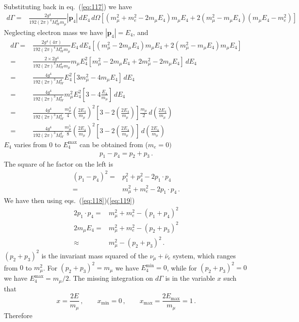 Substituting back in eq.~(\ref{eq:117}) we have 
\begin{align}
  d\Gamma=&\frac{2g^4}{192 (2\pi)^4 M_W^4 m_\mu }|\mathbf{p}_4|\,d E_4\,d\Omega[(m_\mu^2+m_e^2-2m_\mu E_4)m_\mu E_4 
  +2(m_\mu^2-m_\mu E_4)(m_\mu E_4-m_e^2)]
\end{align}
Neglecting electron mass we have $|\mathbf{p}_4| = E_4$, and
\begin{align}
  \label{eq:159}
   d\Gamma=&\frac{2g^4(4\pi)}{192 (2\pi)^4 M_W^4 m_\mu }E_4\,d E_4[(m_\mu^2-2m_\mu E_4)m_\mu E_4 
  +2(m_\mu^2-m_\mu E_4)m_\mu E_4]\nonumber\\
  =&\frac{2\times2g^4}{192 (2\pi)^3 M_W^4 m_\mu }m_\mu E_4^2[m_\mu^2-2m_\mu E_4
  +2m_\mu^2-2m_\mu E_4]\,d E_4\nonumber\\
  =&\frac{4g^4}{192 (2\pi)^3 M_W^4 }E_4^2\left[3m_\mu^2-4m_\mu E_4\right]\,d E_4\nonumber\\
  =&\frac{4g^4}{192 (2\pi)^3 M_W^4 }m_\mu^2E_4^2\left[3-4\frac{E_4}{m_\mu}\right]\,d E_4\nonumber\\
  =&\frac{4g^4}{192 (2\pi)^3 M_W^4 }\frac{m_\mu^4}{4}\left(\frac{2E_4}{m_\mu}\right)^2
  \left[3-2\left(\frac{2E_4}{m_\mu}\right)\right]\frac{m_\mu}{2}\,d \left(\frac{2E_4}{m_\mu}\right)\nonumber\\
 =&\frac{4g^4}{192 (2\pi)^3 M_W^4 }\frac{m_\mu^5}{8}\left(\frac{2E_4}{m_\mu}\right)^2
  \left[3-2\left(\frac{2E_4}{m_\mu}\right)\right]\,d \left(\frac{2E_4}{m_\mu}\right)
\end{align}
$E_4$ varies from 0 to $E_4^{\text{max}}$ can be obtained from ($m_e=0)$
\begin{align}
  \label{eq:119}
p_1-p_4=p_2+p_3\,.
\end{align}
The square of he factor on the left is
\begin{align}
  (p_1-p_4)^2=&p_1^2+p_4^2-2p_1\cdot p_4\nonumber\\
  =&m_\mu^2+m_e^2-2p_1\cdot p_4\,.
\end{align}
We have then using eqs.~(\ref{eq:118})(\ref{eq:119})
\begin{align}
  2p_1\cdot p_4=&m_\mu^2+m_e^2-(p_1+p_4)^2\nonumber\\
  2m_\mu E_4=&m_\mu^2+m_e^2-(p_2+p_3)^2\nonumber\\
  \approx&m_\mu^2-(p_2+p_3)^2\,.
\end{align}
$(p_2+p_3)^2$ is the invariant mass squared of the $\nu_\mu+\bar{\nu}_e$ system, which ranges from $0$ to $m_\mu^2$. For $(p_2+p_3)^2=m_\mu$ we have $E_4^{\text{min}}=0$, while for $(p_2+p_3)^2=0$ we have $E_4^{\text{max}}=m_\mu/2$. The missing integration on $d\Gamma$ is in the variable $x$ such that
\begin{equation}
  x=\frac{2E}{m_\mu}\,,\qquad x_{\text{min}}=0\,,\qquad x_{\text{max}}=\frac{2E_{\text{max}}}{m_\mu}=1\,.
\end{equation}
Therefore


